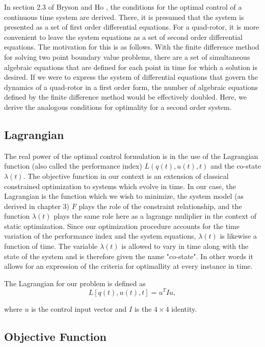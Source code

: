    In section 2.3 of Bryson and Ho \cite{BrysonHo69}, the conditions for the optimal control of a continuous time system are derived. There, it is presumed that the system is  presented as a set of first order differential equations. For a quad-rotor, it is more convenient to leave the system equations as a set of second order differential equations. The motivation for this is as follows. With the finite difference method for solving two point boundary value problems, there are a set of simultaneous algebraic equations that are defined for each point in time for which a solution is desired. If we were to express the system of differential equations that govern the dynamics of a quad-rotor in a first order form, the number of algebraic equations defined by the finite difference method would be effectively doubled. Here, we derive the analogous conditions for optimality for a second order system.

\subsection{Lagrangian}

The real power of the optimal control formulation is in the use of the Lagrangian function (also called the performance index) $L(q(t),u(t),t)$ and the co-state $\lambda(t)$. The objective function in our context is an extension of classical constrained optimization to systems which evolve in time. In our case, the Lagrangian is the function which we wish to minimize, the system model (as derived in chapter 3) $F$ plays the role of the constraint relationship, and the function $\lambda(t)$ plays the same role here as a lagrange muliplier in the context of static optimization. Since our optimization procedure accounts for the time variation of the performance index and the system equations, $\lambda(t)$ is likewise a function of time. The variable  $\lambda(t)$  is allowed to vary in time along with the state of the system and is therefore given the name "co-state". In other words it allows for an expression of the criteria for optimallity at every instance in time.

The Lagrangian for our problem is defined as
\begin{equation}
    L[q(t),u(t),t] = u^T I u ,
\end{equation}

 where $u$ is the control input vector and $I$ is the $4\times4$ identity.

\subsection{Objective Function}

